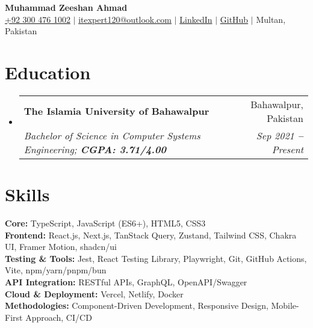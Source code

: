 \documentclass[a4paper,11pt]{article}
\makeatletter
\newcommand{\resumeEducationHeading}[4]{
  \vspace{-2pt}\item
    \begin{tabular*}{0.97\textwidth}[t]{l@{\extracolsep{\fill}}r}
      \textbf{#1} & #2 \\
      \textit{\small#3} & \textit{\small#4} \\
    \end{tabular*}\vspace{-5pt}
}
\newcommand{\resumeSubHeadingListStart}{\begin{itemize}[leftmargin=0.15in, label={}]}
\newcommand{\resumeSubHeadingListEnd}{\end{itemize}}
\makeatother
\begin{document}

\begin{center}
  \textbf{\Huge Muhammad Zeeshan Ahmad} \\ \vspace{3pt}
  \small
  \faMobile \hspace{.5pt} \href{tel:923004761002}{+92 300 476 1002}
  $|$
  \faAt \hspace{.5pt} \href{mailto:itexpert120@outlook.com}{itexpert120@outlook.com}
  $|$
  \faLinkedinSquare \hspace{.5pt} \href{https://www.linkedin.com/in/itexpert120}{LinkedIn}
  $|$
  \faGithub \hspace{.5pt} \href{https://github.com/itexpert120}{GitHub}
  $|$
  \faMapMarker \hspace{.5pt} {Multan, Pakistan}
\end{center}



\section{Education}
\vspace{3pt}
\resumeSubHeadingListStart

\resumeEducationHeading
{The Islamia University of Bahawalpur}{Bahawalpur, Pakistan}
{Bachelor of Science in Computer Systems Engineering; \textbf{CGPA: 3.71/4.00}}{Sep 2021 \textbf{--} Present}

\resumeSubHeadingListEnd


\section{Skills}
\vspace{2pt}
\resumeSubHeadingListStart
\small{\item{
    \textbf{Core:} TypeScript, JavaScript (ES6+), HTML5, CSS3 \\ \vspace{3pt}
    \textbf{Frontend:} React.js, Next.js, TanStack Query, Zustand, Tailwind CSS, Chakra UI, Framer Motion, shadcn/ui \\ \vspace{3pt}
    \textbf{Testing \& Tools:} Jest, React Testing Library, Playwright, Git, GitHub Actions, Vite, npm/yarn/pnpm/bun \\ \vspace{3pt}
    \textbf{API Integration:} RESTful APIs, GraphQL, OpenAPI/Swagger \\ \vspace{3pt}
    \textbf{Cloud \& Deployment:} Vercel, Netlify, Docker \\ \vspace{3pt}
    \textbf{Methodologies:} Component-Driven Development, Responsive Design, Mobile-First Approach,  CI/CD
}}
\resumeSubHeadingListEnd
\end{document}
